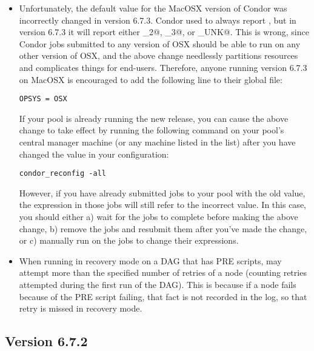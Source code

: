 \begin{itemize}

\item Unfortunately, the default  value for the MacOSX
  version of Condor was incorrectly changed in version 6.7.3.
  Condor used to always report \verb@OSX@, but in version 6.7.3 it
  will report either _2@, _3@, or
  \verb@OSX_UNK@.
  This is wrong, since Condor jobs submitted to any version of OSX
  should be able to run on any other version of OSX, and the above
  change needlessly partitions resources and complicates things for
  end-users.
  Therefore, anyone running version 6.7.3 on MacOSX is encouraged to
  add the following line to their global  file:
\begin{verbatim}
OPSYS = OSX
\end{verbatim}

  If your pool is already running the new release, you can cause the
  above change to take effect by running the following command on your
  pool's central manager machine (or any machine listed in the
   list) after you have changed the
   value in your configuration:
\begin{verbatim}
condor_reconfig -all
\end{verbatim}

  However, if you have already submitted jobs to your pool with the
  old  value, the  expression in
  those jobs will still refer to the incorrect value.
  In this case, you should either a) wait for the jobs to complete
  before making the above change, b) remove the jobs and resubmit
  them after you've made the change, or c) manually run 
  on the jobs to change their  expressions.

\item When running in recovery mode on a DAG that has PRE scripts,
 may attempt more than the specified number of retries
of a node (counting retries attempted during the first run of the
DAG).  This is because if a node fails because of the PRE script
failing, that fact is not recorded in the log, so that retry is missed
in recovery mode.

\end{itemize}



\subsection*{\label{sec:New-6-7-2}Version 6.7.2}


